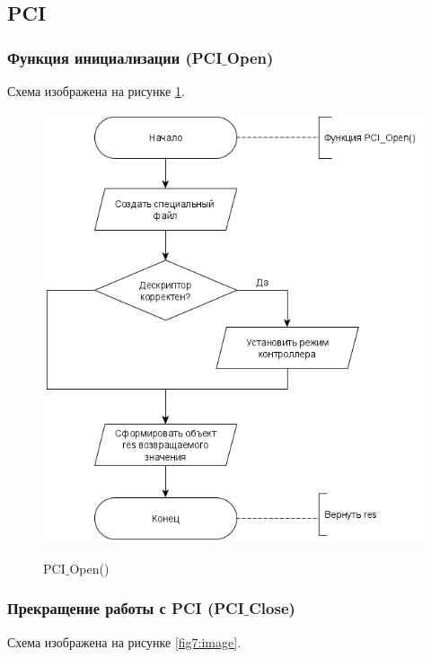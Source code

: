 	\subsection{PCI}
	\subsubsection{Функция инициализации (PCI$\_$Open)}
	
	Схема изображена на рисунке \ref{fig6:image}.
	
	\begin{figure}[ph!]
		\centering
		\begin{center}
			{\includegraphics[scale=0.5]{schemes/pci_open.png}}
			\caption{PCI$\_$Open()}
			\label{fig6:image}
		\end{center}
	\end{figure}

	\newpage

	\subsubsection{Прекращение работы с PCI (PCI$\_$Close)}

	Схема изображена на рисунке \ref{fig7:image}.
	
